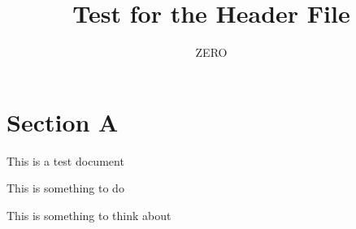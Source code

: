 


\title{Test for the Header File}
\author{ZERO}

\maketitle

\section{Section A}
This is a test document

\begin{todobox}
  This is something to do
\end{todobox}

\begin{thoughts}
  This is something to think about
\end{thoughts}
